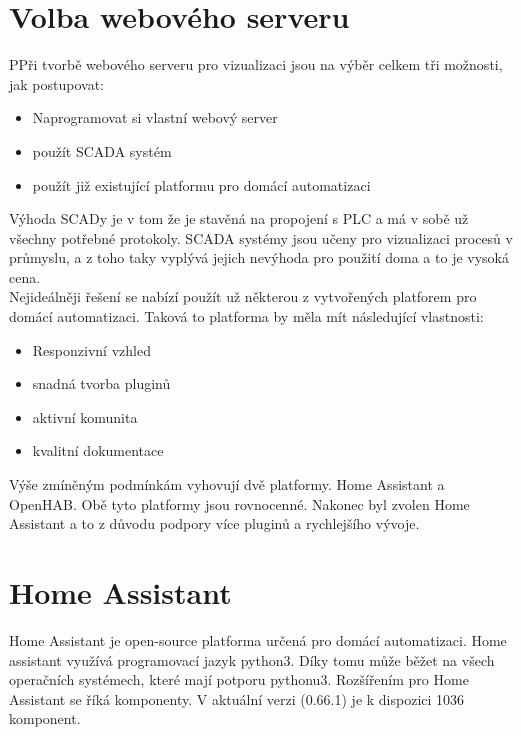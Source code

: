 \documentclass[a4paper,12pt,czech,bibliography=totoc]{scrbook}
\begin{document}
\section{Volba webového serveru}
PPři tvorbě webového serveru pro vizualizaci jsou na výběr celkem tři možnosti, jak postupovat:
\begin{itemize}
	\item Naprogramovat si vlastní webový server
	\item použít SCADA systém
	\item použít již existující platformu pro domácí automatizaci
\end{itemize}
Výhoda SCADy je v tom že je stavěná na propojení s PLC a má v sobě už všechny potřebné protokoly. SCADA systémy jsou učeny pro vizualizaci procesů v průmyslu, a z toho taky vyplývá jejich nevýhoda pro použití doma a to je vysoká cena.
\\
Nejideálněji řešení se nabízí použít už některou z vytvořených platforem pro domácí automatizaci. Taková to platforma by měla mít následující vlastnosti:
\begin{itemize}
	\item Responzivní vzhled
	\item snadná tvorba pluginů
	\item aktivní komunita
	\item kvalitní dokumentace
\end{itemize}
Výše zmíněným podmínkám vyhovují dvě platformy. Home Assistant a OpenHAB. 
Obě tyto platformy jsou rovnocenné. Nakonec byl zvolen Home Assistant a to z důvodu podpory více pluginů a rychlejšího vývoje. 
\section{Home Assistant}
Home Assistant je open-source platforma určená pro domácí automatizaci. Home assistant využívá programovací jazyk python3. Díky tomu může běžet na všech operačních systémech, které mají potporu pythonu3. Rozšířením pro Home Assistant se říká komponenty. V aktuální verzi (0.66.1) je k dispozici 1036 komponent.  
\end{document}
